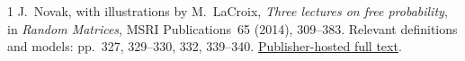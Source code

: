 \documentclass[10pt]{article}
\begin{document}
\begin{thebibliography}{1}\small
{} J.~Novak, with illustrations by M.~LaCroix,
\emph{Three lectures on free probability}, in \emph{Random Matrices},
MSRI Publications~65 (2014), 309--383.
Relevant definitions and models: pp.~327, 329--330, 332, 339--340.
\href{https://library.slmath.org/books/Book65/files/140819-Novak.pdf}{Publisher-hosted full text}.
\end{thebibliography}
\end{document}
